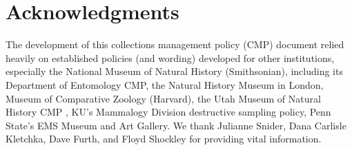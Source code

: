 \documentclass[letterpaper, 11pt]{article}
\begin{document}
\section*{Acknowledgments}
The development of this collections management policy (CMP) document relied heavily on established policies (and wording) developed for other institutions, especially the National Museum of Natural History (Smithsonian)\citep{NMNHpolicy}, including its Department of Entomology CMP\citep{NMNHEntpolicy}, the Natural History Museum in London\citep{NHMpolicy}, Museum of Comparative Zoology (Harvard)\citep{MCZpolicy}, the Utah Museum of Natural History CMP \citep{UtahCMP}, KU's Mammalogy Division destructive sampling policy\citep{KUmammals}, Penn State's EMS Museum and Art Gallery\citep{PSUEMS}. We thank Julianne Snider, Dana Carlisle Kletchka, Dave Furth, and Floyd Shockley for providing vital information.


\clearpage
{}
\end{document}
